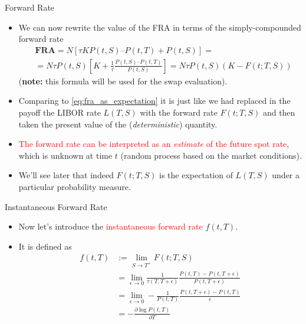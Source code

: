 \documentclass{beamer}
\begin{document}
\begin{frame}{Forward Rate}
	\begin{itemize}
		\item We can now rewrite the value of the FRA in terms of the simply-compounded forward rate
		\begin{equation}
			\begin{aligned}
			&\textbf{FRA}=N[\tau KP(t,S)–P(t,T)+P(t,S)] = \\
			&=N\tau P(t,S) \left[K +\frac{1}{\tau} \frac{P(t,S)–P(t,T)}{P(t,S)}\right] = N\tau P(t,S)(K-F(t;T,S))
			\end{aligned}
			\label{eq:fram_payoff_withF}
		\end{equation}
		(\textbf{note:} this formula will be used for the swap evaluation).
		\item<2-> Comparing to \cref{eq:fra_as_expectation} it is just like we had replaced in the payoff the LIBOR rate $L(T,S)$ with the forward rate $F(t;T,S)$ and then taken the present value of the (\emph{deterministic}) quantity.
		\item<3-> \textcolor{red}{The forward rate can be interpreted as an \emph{estimate} of the future spot rate}, which is unknown at time $t$ (random process based on the market conditions).
		\item<4-> We'll see later that indeed $F(t;T,S)$ is the expectation of $L(T,S)$ under a particular probability measure.
	\end{itemize}
\end{frame}

\begin{frame}{Instantaneous Forward Rate}
	\begin{itemize}
		\item Now let's introduce the \textcolor{red}{instantaneous forward rate} $f(t, T)$.
		\item It is defined as 
		\begin{equation}
			\begin{aligned}
				f(t, T) &:= \lim_{S\rightarrow T^+} F(t;T,S) \\
				& = \lim_{\epsilon\rightarrow 0}  \frac{1}{\tau(T,T+\epsilon)}\frac{P(t,T)-P(t,T+\epsilon)}{P(t,T+\epsilon)} \\
				& = \lim_{\epsilon\rightarrow 0} - \frac{1}{P(t,T)} \frac{P(t,T+\epsilon)-P(t,T)}{\epsilon} \\
				& = -\frac{\partial \log P(t, T)}{\partial T}
			\end{aligned}
		\end{equation}
	\end{itemize}
\end{frame}
\end{document}
